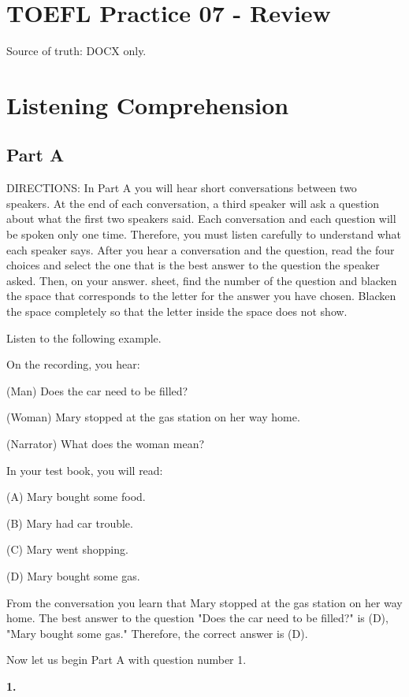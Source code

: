 \documentclass[12pt]{article}
\begin{document}
\section*{TOEFL Practice 07 - Review}
Source of truth: DOCX only.
\section*{Listening Comprehension}
\subsection*{Part A}
DIRECTIONS: In Part A you will hear short conversations between two speakers. At the end of each conversation, a third speaker will ask a question about what the first two speakers said. Each conversation and each question will be spoken only one time. Therefore, you must listen carefully to understand what each speaker says. After you hear a conversation and the question, read the four choices and select the one that is the best answer to the question the speaker asked. Then, on your answer. sheet, find the number of the question and blacken the space that corresponds to the letter for the answer you have chosen. Blacken the space completely so that the letter inside the space does not show.\par
\begin{exampleblock}
Listen to the following example.\par
On the recording, you hear:\par
(Man) Does the car need to be filled?\par
(Woman) Mary stopped at the gas station on her way home.\par
(Narrator) What does the woman mean?\par
In your test book, you will read:\par
(A) Mary bought some food.\par
(B) Mary had car trouble.\par
(C) Mary went shopping.\par
(D) Mary bought some gas.\par
From the conversation you learn that Mary stopped at the gas station on her way home. The best answer to the question "Does the car need to be filled?" is (D), "Mary bought some gas." Therefore, the correct answer is (D).\par
Now let us begin Part A with question number 1.\par
\end{exampleblock}
\noindent\textbf{1.}
\end{document}

